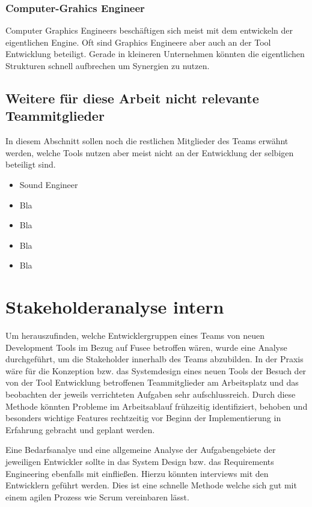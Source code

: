 \documentclass[pagesize, paper=a4, fontsize=12pt,titlepage=true, headings=small, headnosepline, abstractoff, liststotoc, nochapterprefix, plainheadsepline, twoside]{scrreprt}
\begin{document}
\subsubsection{Computer-Grahics Engineer}
Computer Graphics Engineers beschäftigen sich meist mit dem entwickeln der eigentlichen Engine. Oft sind Graphics Engineere aber auch an der Tool Entwicklung beteiligt. Gerade in kleineren Unternehmen könnten die eigentlichen Strukturen schnell aufbrechen um Synergien zu nutzen.

\subsection{Weitere für diese Arbeit nicht relevante Teammitglieder}
In diesem Abschnitt sollen noch die restlichen Mitglieder des Teams erwähnt werden, welche Tools nutzen aber meist nicht an der Entwicklung der selbigen beteiligt sind.
\begin{itemize}
\item Sound Engineer
\item Bla
\item Bla 
\item Bla 
\item Bla 
\end{itemize}

\section{Stakeholderanalyse intern}
Um herauszufinden, welche Entwicklergruppen eines Teams von neuen Development Tools im Bezug auf Fusee betroffen wären, wurde eine Analyse durchgeführt, um die Stakeholder innerhalb des Teams abzubilden. In der Praxis wäre für die Konzeption bzw. das Systemdesign eines neuen Tools der Besuch der von der Tool Entwicklung betroffenen Teammitglieder am Arbeitsplatz und das beobachten der jeweils verrichteten Aufgaben sehr aufschlussreich. Durch diese Methode könnten Probleme im Arbeitsablauf frühzeitig identifiziert, behoben und besonders wichtige Features rechtzeitig vor Beginn der Implementierung in Erfahrung gebracht und geplant werden.

Eine Bedarfsanalye und eine allgemeine Analyse der Aufgabengebiete der jeweiligen Entwickler sollte in das System Design bzw. das Requirements Engineering ebenfalls mit einfließen. Hierzu könnten interviews mit den Entwicklern geführt werden. Dies ist eine schnelle Methode welche sich gut mit einem agilen Prozess wie Scrum vereinbaren lässt.
\end{document}
